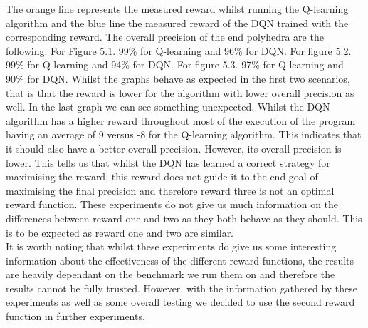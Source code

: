The orange line represents the measured reward whilst running the Q-learning algorithm and the blue line the measured reward of the DQN trained with the corresponding reward. The overall precision of the end polyhedra are the following: For Figure 5.1. 99\% for Q-learning and 96\% for DQN. For figure 5.2. 99\% for Q-learning and 94\% for DQN. For figure 5.3. 97\% for Q-learning and 90\% for DQN. Whilst the graphs behave as expected in the first two scenarios, that is that the reward is lower for the algorithm with lower overall precision as well. In the last graph we can see something unexpected. Whilst the DQN algorithm has a higher reward throughout most of the execution of the program having an average of 9 versus -8 for the Q-learning algorithm. This indicates that it should also have a better overall precision. However, its overall precision is lower. This tells us that whilst the DQN has learned a correct strategy for maximising the reward, this reward does not guide it to the end goal of maximising the final precision and therefore reward three is not an optimal reward function. These experiments do not give us much information on the differences between reward one and two as they both behave as they should. This is to be expected as reward one and two are similar.\\
It is worth noting that whilst these experiments do give us some interesting information about the effectiveness of the different reward functions, the results are heavily dependant on the benchmark we run them on and therefore the results cannot be fully trusted. However, with the information gathered by these experiments as well as some overall testing we decided to use the second reward function in further experiments.


